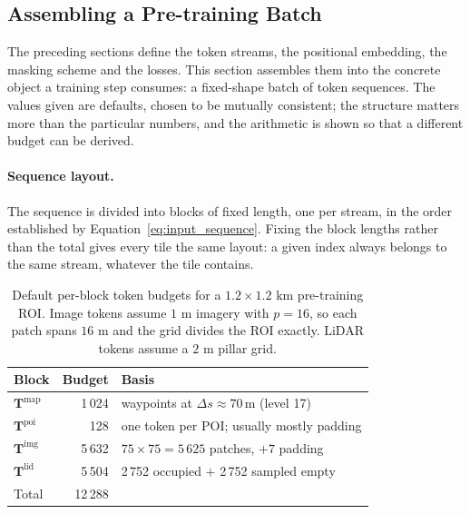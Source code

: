 \documentclass{book}
\begin{document}
\subsection{Assembling a Pre-training Batch}
\label{sec:batch_assembly}

The preceding sections define the token streams, the positional
embedding, the masking scheme and the losses.  This section
assembles them into the concrete object a training step consumes:
a fixed-shape batch of token sequences.  The values given are
defaults, chosen to be mutually consistent; the structure matters
more than the particular numbers, and the arithmetic is shown so
that a different budget can be derived.

\paragraph{Sequence layout.}

The sequence is divided into blocks of fixed length, one per
stream, in the order established by
Equation~\eqref{eq:input_sequence}.  Fixing the block lengths
rather than the total gives every tile the same layout: a given
index always belongs to the same stream, whatever the tile
contains.

\begin{table}[htbp]
  \centering
  \small
  \begin{tabular}{lrl}
    \hline
    \textbf{Block} & \textbf{Budget} & \textbf{Basis} \\
    \hline
    $\mathbf{T}^{\text{map}}$ & 1\,024 &
      waypoints at $\Delta s \approx 70$\,m (level 17) \\
    $\mathbf{T}^{\text{poi}}$ & 128 &
      one token per POI; usually mostly padding \\
    $\mathbf{T}^{\text{img}}$ & 5\,632 &
      $75 \times 75 = 5\,625$ patches, $+7$ padding \\
    $\mathbf{T}^{\text{lid}}$ & 5\,504 &
      2\,752 occupied $+$ 2\,752 sampled empty \\
    \hline
    Total & 12\,288 & \\
    \hline
  \end{tabular}
  \caption{Default per-block token budgets for a $1.2 \times 1.2$
    km pre-training ROI.  Image tokens assume $1$ m imagery with
    $p = 16$, so each patch spans $16$ m and the grid divides the
    ROI exactly.  LiDAR tokens assume a $2$ m pillar grid.}
  \label{tab:seq_layout}
\end{table}
\end{document}
